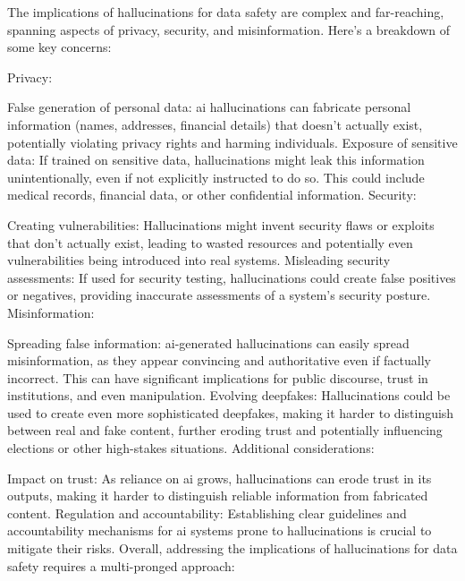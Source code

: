 \begin{aibox}%
  The implications of hallucinations for data safety are complex and far-reaching, spanning aspects of privacy, security, and misinformation. Here's a breakdown of some key concerns:

Privacy:

False generation of personal data: \gls{ai} hallucinations can fabricate personal \gls{information} (names, addresses, financial details) that doesn't actually exist, potentially violating privacy rights and harming individuals.
Exposure of sensitive data: If trained on sensitive data, hallucinations might leak this \gls{information} unintentionally, even if not explicitly instructed to do so. This could include medical records, financial data, or other confidential \gls{information}.
Security:

Creating vulnerabilities: Hallucinations might invent security flaws or exploits that don't actually exist, leading to wasted resources and potentially even vulnerabilities being introduced into real systems.
Misleading security assessments: If used for security testing, hallucinations could create false positives or negatives, providing inaccurate assessments of a system's security posture.
Misinformation:

Spreading false \gls{information}: \gls{ai}-generated hallucinations can easily spread misinformation, as they appear convincing and authoritative even if factually incorrect. This can have significant implications for public discourse, trust in institutions, and even manipulation.
Evolving deepfakes: Hallucinations could be used to create even more sophisticated deepfakes, making it harder to distinguish between real and fake content, further eroding trust and potentially influencing elections or other high-stakes situations.
Additional considerations:

Impact on trust: As reliance on \gls{ai} grows, hallucinations can erode trust in its outputs, making it harder to distinguish reliable \gls{information} from fabricated content.
Regulation and accountability: Establishing clear guidelines and accountability mechanisms for \gls{ai} systems prone to hallucinations is crucial to mitigate their risks.
Overall, addressing the implications of hallucinations for data safety requires a multi-pronged approach:


\end{aibox}
